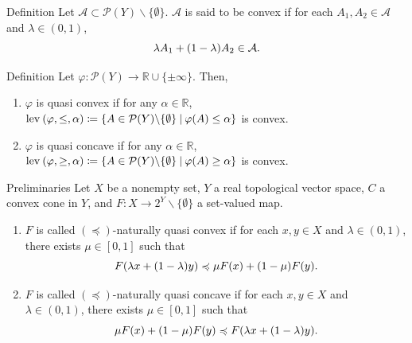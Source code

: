 \documentclass[aspectratio=169, dvipdfmx, 11pt]{beamer}
\newcommand{\RealNumberSet}{\mathbb{R}}
\newcommand{\OrderingLevelSets}[3]{\text{\rm lev\:$({#1}, {#2}, {#3})$}} %
\newcommand{\SetForm}[2]{
  \{{#1}\:|\:{#2}\}
}
\begin{document}
\begin{frame}
  \begin{block}{Definition}
    Let $\mathcal{A} \subset \mathcal{P}(Y) \backslash \{\emptyset\}$. $\mathcal{A}$ is said to be convex if for each $A_1, A_2 \in \mathcal{A}$ and $\lambda \in (0,1)$,
    \begin{equation}
      \lambda A_1 + (1-\lambda) A_2 \in \mathcal{A}. \notag
    \end{equation}
  \end{block}

  \begin{block}{Definition}
    Let $\varphi \colon \mathcal{P}(Y) \to \RealNumberSet \cup \{\pm \infty\}$. Then,
    \begin{enumerate}
      \item $\varphi$ is quasi convex if for any $\alpha \in \RealNumberSet$,
            $\OrderingLevelSets{\varphi}{\leq}{\alpha} \coloneqq \SetForm{A \in \mathcal{P}(Y) \backslash \{\emptyset\}}{\varphi(A) \leq \alpha}$ is convex.
      \item $\varphi$ is quasi concave if for any $\alpha \in \RealNumberSet$,
            $\OrderingLevelSets{\varphi}{\geq}{\alpha} \coloneqq \SetForm{A \in \mathcal{P}(Y) \backslash \{\emptyset\}}{\varphi(A) \geq \alpha}$ is convex.
    \end{enumerate}
  \end{block}
\end{frame}

\begin{frame}{Preliminaries}
  Let $X$ be a nonempty set, $Y$ a real topological vector space, $C$ a convex cone in $Y$, and $F\colon X \to 2^Y \backslash \{\emptyset\}$ a set-valued map.
  \begin{enumerate}
    \item $F$ is called $(\preccurlyeq)$-naturally quasi convex if for each $x,y \in X$ and $\lambda \in (0,1)$, there exists $\mu \in [0,1]$ such that
          \begin{equation}
            F(\lambda x + (1-\lambda)y) \preccurlyeq \mu F(x) + (1-\mu) F(y). \notag
          \end{equation}
    \item $F$ is called $(\preccurlyeq)$-naturally quasi concave if for each $x,y \in X$ and $\lambda \in (0,1)$, there exists $\mu \in [0,1]$ such that
          \begin{equation}
            \mu F(x) + (1-\mu) F(y) \preccurlyeq F(\lambda x + (1-\lambda)y). \notag
          \end{equation}
  \end{enumerate}
\end{frame}
\end{document}
